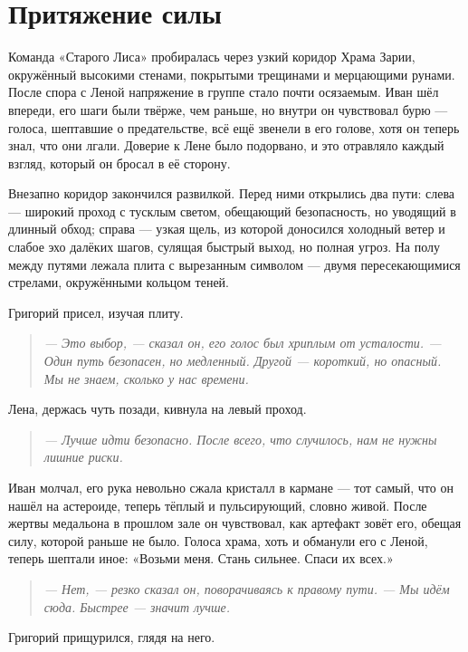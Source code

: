 \documentclass[12pt,a4paper]{book}
\newenvironment{dialogue}{\begin{quote}\itshape}{\end{quote}}
\begin{document}
\chapter{Притяжение силы}

Команда «Старого Лиса» пробиралась через узкий коридор Храма Зарии, окружённый высокими стенами, покрытыми трещинами и мерцающими рунами. После спора с Леной напряжение в группе стало почти осязаемым. Иван шёл впереди, его шаги были твёрже, чем раньше, но внутри он чувствовал бурю --- голоса, шептавшие о предательстве, всё ещё звенели в его голове, хотя он теперь знал, что они лгали. Доверие к Лене было подорвано, и это отравляло каждый взгляд, который он бросал в её сторону.

Внезапно коридор закончился развилкой. Перед ними открылись два пути: слева --- широкий проход с тусклым светом, обещающий безопасность, но уводящий в длинный обход; справа --- узкая щель, из которой доносился холодный ветер и слабое эхо далёких шагов, сулящая быстрый выход, но полная угроз. На полу между путями лежала плита с вырезанным символом --- двумя пересекающимися стрелами, окружёнными кольцом теней.

Григорий присел, изучая плиту.

\begin{dialogue}
--- Это выбор, --- сказал он, его голос был хриплым от усталости. --- Один путь безопасен, но медленный. Другой --- короткий, но опасный. Мы не знаем, сколько у нас времени.
\end{dialogue}

Лена, держась чуть позади, кивнула на левый проход.

\begin{dialogue}
--- Лучше идти безопасно. После всего, что случилось, нам не нужны лишние риски.
\end{dialogue}

Иван молчал, его рука невольно сжала кристалл в кармане --- тот самый, что он нашёл на астероиде, теперь тёплый и пульсирующий, словно живой. После жертвы медальона в прошлом зале он чувствовал, как артефакт зовёт его, обещая силу, которой раньше не было. Голоса храма, хоть и обманули его с Леной, теперь шептали иное: «Возьми меня. Стань сильнее. Спаси их всех.»

\begin{dialogue}
--- Нет, --- резко сказал он, поворачиваясь к правому пути. --- Мы идём сюда. Быстрее --- значит лучше.
\end{dialogue}

Григорий прищурился, глядя на него.
\end{document}
